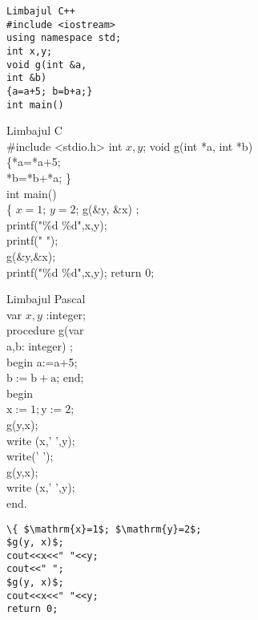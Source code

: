 \begin{verbatim}
Limbajul C++
#include <iostream>
using namespace std;
int x,y;
void g(int &a,
int &b)
{a=a+5; b=b+a;}
int main()
\end{verbatim}

Limbajul C\\
\#include <stdio.h> int $x, y$; void g(int *a, int *b)\\
\{*a=*a+5;\\
*b=*b+*a; \}\\
int main()\\
\{ $x=1$; $y=2$; g(\&y, \&x) ;\\
printf("\%d \%d",x,y);\\
printf(" ");\\
g(\&y,\&x);\\
printf("\%d \%d",x,y); return 0;

Limbajul Pascal\\
var $x, y$ :integer;\\
procedure g(var\\
a,b: integer) ;\\
begin a:=a+5;\\
$\mathrm{b}:=\mathrm{b}+\mathrm{a}$; end;\\
begin\\
$\mathrm{x}:=1 ; \mathrm{y}:=2$;\\
g(y,x);\\
write (x,' ',y);\\
write(' ');\\
g(y,x);\\
write (x,' ',y);\\
end.

\begin{verbatim}
\{ $\mathrm{x}=1$; $\mathrm{y}=2$;
$g(y, x)$;
cout<<x<<" "<<y;
cout<<" ";
$g(y, x)$;
cout<<x<<" "<<y;
return 0;
\end{verbatim}

